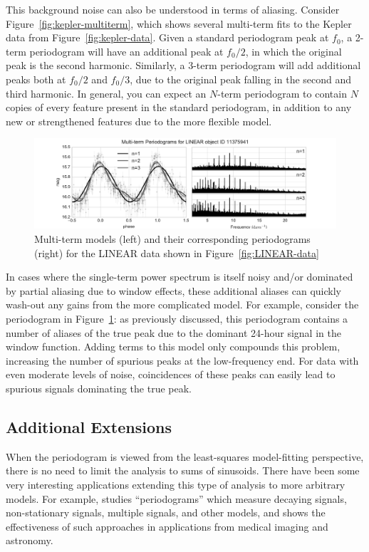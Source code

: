 \documentclass[preprint]{aastex}
\newcommand{\fig}[1]{Figure~\ref{fig:#1}}
\newcommand{\figlabel}[1]{\label{fig:#1}}
\begin{document}
This background noise can also be understood in terms of aliasing.
Consider \fig{kepler-multiterm}, which shows several multi-term fits to the
Kepler data from \fig{kepler-data}.
Given a standard periodogram peak at $f_0$, a 2-term periodogram will have an
additional peak at $f_0 / 2$, in which the original peak is the second
harmonic. Similarly, a 3-term periodogram will add additional peaks both at
$f_0 / 2$ and $f_0 / 3$, due to the original peak falling in the second and
third harmonic.
In general, you can expect an $N$-term periodogram to contain $N$ copies of
every feature present in the standard periodogram, in addition to any
new or strengthened features due to the more flexible model.

\begin{figure}[ht]
  \centering
  \includegraphics[width=\textwidth]{fig22_LINEAR_multiterm}
  \caption{Multi-term models (left) and their corresponding periodograms (right)
    for the LINEAR data shown in \fig{LINEAR-data}
    \figlabel{LINEAR-multiterm}}
\end{figure}

In cases where the single-term power spectrum is itself noisy and/or dominated
by partial aliasing due to window effects, these additional aliases can
quickly wash-out any gains from the more complicated model.
For example, consider the periodogram in \fig{LINEAR-multiterm}: as previously
discussed, this periodogram contains a number of aliases of the true peak due
to the dominant 24-hour signal in the window function.
Adding terms to this model only compounds this problem, increasing the number of
spurious peaks at the low-frequency end.
For data with even moderate levels of noise, coincidences of these peaks can
easily lead to spurious signals dominating the true peak.

\subsection{Additional Extensions}
When the periodogram is viewed from the least-squares model-fitting perspective,
there is no need to limit the analysis to sums of sinusoids.
There have been some very interesting applications extending this type of
analysis to more arbitrary models.
For example, \citet{Bretthorst88} studies ``periodograms'' which measure
decaying signals, non-stationary signals, multiple signals, and other models,
and shows the effectiveness of such approaches in applications from
medical imaging and astronomy.
\end{document}
